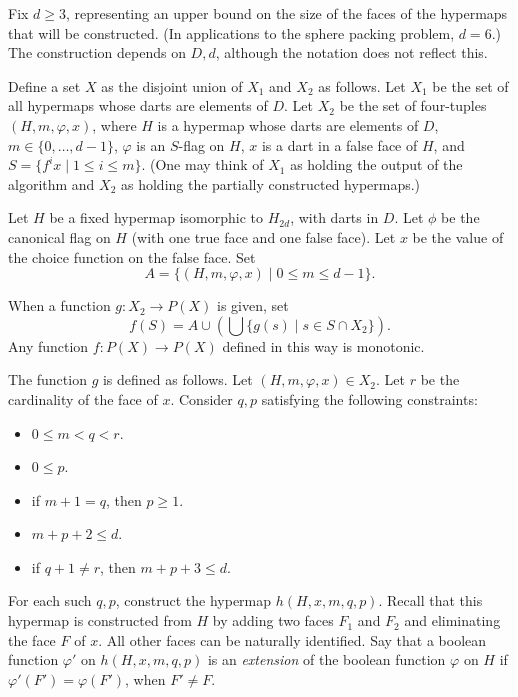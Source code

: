 Fix $d\ge 3$, representing an upper bound on the size of the faces of the hypermaps that will be constructed.  (In applications to the sphere packing problem, $d=6$.)
The construction depends on $D,d$, although the notation does not reflect this.

Define a set $X$ as the disjoint union of $X_1$ and $X_2$ as follows.  Let $X_1$ be the
set of all hypermaps whose darts are elements of $D$.  Let $X_2$ be the set of four-tuples
$(H,m,\varphi,x)$, where $H$ is a hypermap whose darts are elements of $D$, 
$m\in\{0,\ldots,d-1\}$, $\varphi$ is an $S$-flag on $H$, $x$ is a dart in a false face of $H$,
and $S = \{f^i x\mid 1 \le i \le m\}$.   (One may think of $X_1$ as holding the output of the algorithm and $X_2$ as holding the partially constructed hypermaps.)

Let $H$ be a fixed hypermap isomorphic to $H_{2d}$,
with darts in $D$.  Let $\phi$ be the canonical flag on $H$ (with one true face and one false face).
Let $x$ be the value of the choice function on the false face.  Set
$$A = \{(H,m,\varphi,x) \mid 0\le m \le d-1 \}.$$

When a function 
$g:X_2 \to P(X)$ is given, set 
$$f(S) = A \cup  (\bigcup  \{g(s) \mid s\in S\cap X_2\}).$$
Any function $f :P(X)\to P(X)$ defined in this way is monotonic.

The function $g$ is defined as follows.  Let $(H,m,\varphi,x)\in X_2$.  Let $r$ be the
cardinality of the face of $x$.  Consider $q,p$ satisfying the following constraints:
\begin{itemize}
\item $0\le m < q < r$.
\item $0\le p$.
\item if $m+1 = q$, then $p \ge 1$.
\item $m+p+2 \le d$.
\item if $q+1\ne r$, then $m+p+3\le d$.
\end{itemize}

For each such $q,p$, construct the hypermap $h(H,x,m,q,p)$.  Recall that this hypermap is constructed from $H$ by adding two faces $F_1$ and $F_2$ and eliminating the face $F$ of $x$.  All other faces can be naturally identified.  Say that a boolean function $\varphi'$ on $h(H,x,m,q,p)$ is an {\it extension} of the boolean function $\varphi$ on $H$ if $\varphi'(F') =\varphi(F')$, when $F'\ne F$.  


